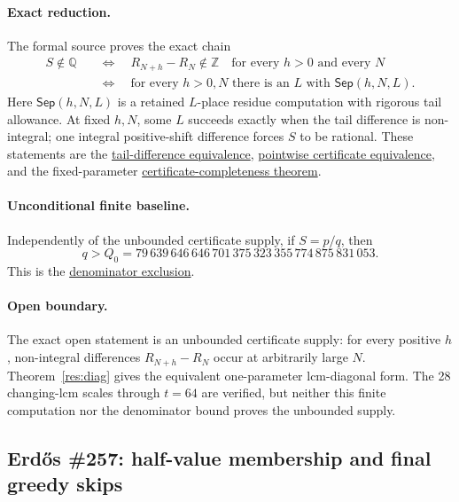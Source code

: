 \documentclass[11pt]{article}
\newcommand{\commit}{ebc98ee71f6819bd9fe344a0bb343542c604e533}
\newcommand{\repobase}{https://github.com/wcook04/plectis-lean-erdos249-257/blob/\commit}
\newcommand{\PK}{Erdos249257}
\newcommand{\lword}[4]{\href{\repobase/\PK/#1\#L#2}{#4}}
\theoremstyle{definition}
\theoremstyle{remark}
\newcommand{\Z}{\mathbb{Z}}
\newcommand{\Q}{\mathbb{Q}}
\newcommand{\Qzero}{Q_0}
\begin{document}
\paragraph{Exact reduction.}
The formal source proves the exact chain
\[
\begin{split}
 S\notin\Q
 &\quad\Longleftrightarrow\quad
   R_{N+h}-R_N\notin\Z
   \quad\text{for every }h>0\text{ and every }N\\
 &\quad\Longleftrightarrow\quad
   \text{for every }h>0,N\text{ there is an }L
   \text{ with }\mathsf{Sep}(h,N,L).
\end{split}
\]
Here \(\mathsf{Sep}(h,N,L)\) is a retained \(L\)-place residue computation
with rigorous tail allowance.  At fixed \(h,N\), some \(L\) succeeds exactly
when the tail difference is non-integral; one integral positive-shift
difference forces \(S\) to be rational.  These statements are the
\lword{LcmConeFlatness.lean}{386}{irrational_totient_series_iff_all_tail_diffs_nonintegral}{tail-difference equivalence},
\lword{LcmConeFlatness.lean}{399}{irrational_totient_series_iff_pointwise_certificates}{pointwise certificate equivalence},
and the fixed-parameter
\lword{LcmConeFlatness.lean}{316}{exists_certifiedKill_iff_tail_diff_notMem_int}{certificate-completeness theorem}.

\paragraph{Unconditional finite baseline.}
Independently of the unbounded certificate supply, if \(S=p/q\), then
\[
 q>\Qzero
 =79\,639\,646\,646\,701\,375\,323\,355\,774\,875\,831\,053.
\]
This is the \lword{CertificateKernel.lean}{18056}{tsum_totient_div_pow_two_ne_ratCast_of_den_le_79639646646701375323355774875831053}{denominator exclusion}.

\paragraph{Open boundary.}
The exact open statement is an unbounded certificate supply: for every
positive \(h\), non-integral differences \(R_{N+h}-R_N\) occur at
arbitrarily large \(N\).  Theorem~\ref{res:diag} gives the equivalent
one-parameter lcm-diagonal form.  The 28 changing-lcm scales through
\(t=64\) are verified, but neither this finite computation nor the
denominator bound proves the unbounded supply.

\subsection{Erd\H{o}s \#257: half-value membership and final greedy skips}
\label{res:halfstory}
\end{document}
